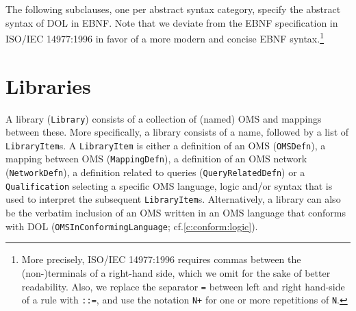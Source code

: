 \documentclass[10pt,fleqn,%
\ifpretendfinal
final%
\else
draft%
\fi,
]{scrreprt}
\makeatletter
\newcommand{\red}[1]{#1} %
\newcommand*{\cf}{cf.\@\xspace}
\newcommand*{\termref}[1]{\index{#1}#1\xspace}
\newcommand*{\syntax}[1]{\texttt{#1}}
\newcommand*{\IS}{OMG Specification\xspace}
\newcommand{\sclause}[1]{\section{#1}}
\newcommand{\nisref}[1]{#1}
\makeatother
\begin{document}
The following subclauses, one per abstract syntax category, specify the abstract syntax of DOL in EBNF. Note that we deviate from the EBNF specification in
 \nisref{ISO/IEC 14977:1996} in favor of a more modern and concise
EBNF syntax.\footnote{\red{More precisely, \nisref{ISO/IEC 14977:1996} requires commas between the (non-)terminals of a right-hand side, which we omit 
for the sake of better readability. Also, we replace the separator \syntax{=}
between left and right hand-side of a rule with \syntax{::=}, and 
use the notation \syntax{N+}
for one or more repetitions of \syntax{N}.}}  

\sclause{Libraries}\label{c:libraries}

A \termref{library} (\syntax{Library}) consists of a collection of (named)  OMS and mappings between these.  More specifically, a
library consists of a name, followed by a list of
\syntax{LibraryItem}s.  A \syntax{LibraryItem} is either a
definition of an OMS  (\syntax{OMSDefn}), 
a mapping between OMS
(\syntax{MappingDefn}), 
\red{a definition of an OMS network  (\syntax{NetworkDefn}),}
a definition related to queries 
(\syntax{QueryRelatedDefn})
or a \syntax{Qualification} selecting a specific
OMS language, logic and/or syntax that is used to interpret the
subsequent \syntax{LibraryItem}s.  Alternatively, a library can also be the verbatim inclusion of an OMS written in
an OMS language that conforms with DOL (\syntax{OMSInConformingLanguage}; \cf \ref{c:conform:logic}).
\end{document}
